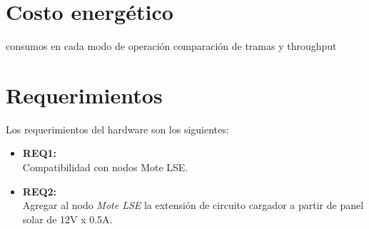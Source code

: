 
\section{Costo energético}
\label{sec:costo}
consumos en cada modo de operación
comparación de tramas y throughput


\clearpage
\section{Requerimientos}
\label{sec:requerimientos}

\noindent Los requerimientos del hardware son los siguientes:
\begin{itemize}
	\item \textbf{REQ1:}\\ Compatibilidad con nodos Mote LSE.
	\item \textbf{REQ2:}\\ Agregar al nodo \textit{Mote LSE} la extensión de circuito cargador a partir de panel solar de 12V x 0.5A.
\end{itemize}
	
